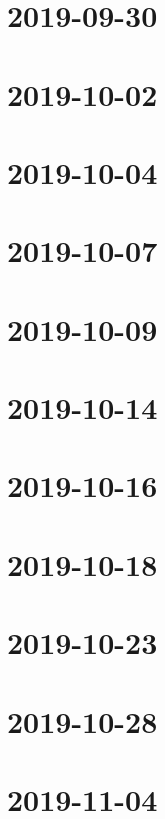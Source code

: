 \documentclass{book}
\begin{document}
\chapter{2019-09-30}
 

\chapter{2019-10-02}


\chapter{2019-10-04}


\chapter{2019-10-07}


\chapter{2019-10-09}


\chapter{2019-10-14}


\chapter{2019-10-16}


\chapter{2019-10-18}


\chapter{2019-10-23}


\chapter{2019-10-28}


\chapter{2019-11-04}


\end{document}
